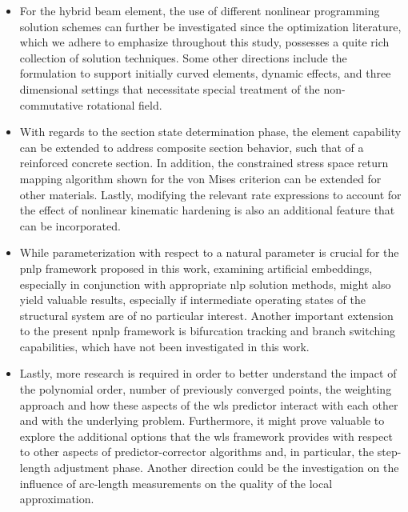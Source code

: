 \begin{itemize}
	\item For the hybrid beam element,  the use of different nonlinear 
	programming 
	solution schemes can further be investigated since the optimization 
	literature, 
	which we adhere to emphasize throughout this study, possesses a quite rich 
	collection of solution techniques.  Some other directions include the 
	formulation  
	to support initially curved elements, dynamic effects, and three 
	dimensional settings that necessitate special treatment of the 
	non-commutative 
	rotational field. 
	
	\item With regards to the section state determination phase, the element 
	capability can be extended to address composite section behavior, such that 
	of a 
	reinforced concrete section. In addition, the constrained stress space 
	return 
	mapping algorithm shown for the von Mises criterion can be extended for 
	other 
	materials. Lastly, modifying the relevant rate expressions to account for 
	the 
	effect of nonlinear kinematic hardening is also an additional feature that 
	can be 
	incorporated.
	
	\item While parameterization with respect to a natural parameter is crucial 
	for 
	the \acrshort{pnlp} framework proposed in this work, examining artificial 
	embeddings, especially in conjunction with appropriate \acrshort{nlp} 
	solution 
	methods, might also yield valuable results, especially if intermediate 
	operating 
	states of the structural system are of no particular interest. Another 
	important 
	extension to the present \acrshort{npnlp} framework is bifurcation tracking 
	and 
	branch switching capabilities, which have not been investigated in this 
	work.
	
	\item Lastly, more research is required in order to better understand the 
	impact 
	of the polynomial order, number of previously converged points, the 
	weighting 
	approach and how these aspects of the \acrshort{wls} predictor interact 
	with each 
	other and with the underlying problem. Furthermore, it might prove valuable 
	to 
	explore the additional options that the \acrshort{wls} framework provides 
	with 
	respect to other aspects of predictor-corrector algorithms and, in 
	particular, the 
	step-length adjustment phase. Another direction could be the investigation 
	on the 
	influence of arc-length measurements on the quality of the local 
	approximation.
	
\end{itemize}



